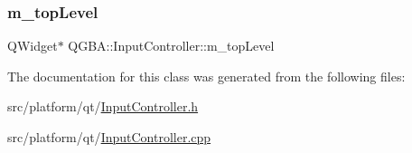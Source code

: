 \subsubsection{\texorpdfstring{m\+\_\+top\+Level}{m\_topLevel}}
{\footnotesize\ttfamily Q\+Widget$\ast$ Q\+G\+B\+A\+::\+Input\+Controller\+::m\+\_\+top\+Level\hspace{0.3cm}{\ttfamily [private]}}



The documentation for this class was generated from the following files\+:\begin{DoxyCompactItemize}
\item 
src/platform/qt/\mbox{\hyperlink{_input_controller_8h}{Input\+Controller.\+h}}\item 
src/platform/qt/\mbox{\hyperlink{_input_controller_8cpp}{Input\+Controller.\+cpp}}\end{DoxyCompactItemize}
